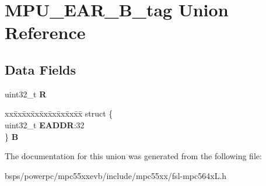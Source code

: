 \hypertarget{unionMPU__EAR__32B__tag}{}\section{M\+P\+U\+\_\+\+E\+A\+R\+\_\+B\+\_\+tag Union Reference}
\label{unionMPU__EAR__32B__tag}
\subsection*{Data Fields}
\begin{DoxyCompactItemize}
\item 
\mbox{\label{unionMPU__EAR__32B__tag_ad790d6ae14e220161883db5fc42646e7}} 
uint32\+\_\+t {\bfseries R}
\item 
\mbox{\label{unionMPU__EAR__32B__tag_a2702c63616624a53ffe414be277fbf0f}} 
\begin{tabbing}
xx\=xx\=xx\=xx\=xx\=xx\=xx\=xx\=xx\=\kill
struct \{\\
\>uint32\_t {\bfseries EADDR}:32\\
\} {\bfseries B}\\

\end{tabbing}\end{DoxyCompactItemize}


The documentation for this union was generated from the following file\+:\begin{DoxyCompactItemize}
\item 
bsps/powerpc/mpc55xxevb/include/mpc55xx/fsl-\/mpc564x\+L.\+h\end{DoxyCompactItemize}
